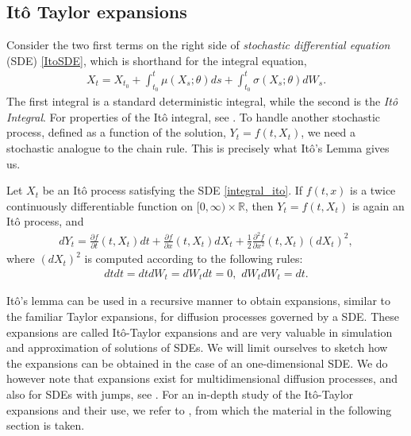\subsection{Itô Taylor expansions}
\label{sec_sub_ito_taylor}
Consider the two first terms on the right side of \textit{stochastic differential equation} (SDE) \eqref{ItoSDE}, which is shorthand for the integral equation,
\begin{align}\label{integral_ito}
X_t=X_{t_0}+\int_{t_0}^{t}\mu(X_s;\theta)ds+\int_{t_0}^{t}\sigma(X_s;\theta)dW_s.
\end{align}
The first integral is a standard deterministic integral, while the second is the \textit{Itô Integral}.
For properties of the Itô integral, see \citet[Chapter 3.2, p.~30]{oksendal2003stochastic}.
To handle another stochastic process, defined as a function of the solution, $Y_t= f(t,X_t)$, we need a stochastic analogue to the chain rule.
This is precisely what Itô's Lemma gives us.
\begin{theorem}\label{thorem; Ito lemma}
	Let $X_t$ be an Itô process satisfying the SDE \ref{integral_ito}.
	If $f(t,x)$ is a twice continuously differentiable function on $[0,\infty)\times\mathbb{R}$, then
	$
	Y_t=f(t,X_t)
	$
	is again an Itô process, and
	\begin{align}
	dY_t=\frac{\partial f}{\partial t}(t,X_t)dt+\frac{\partial f}{\partial x}(t,X_t)dX_t+
	\frac{1}{2}\frac{\partial^2 f}{\partial x^2}(t,X_t)\left(dX_t\right)^2,
	\end{align}
	where $(dX_t)^2$ is computed according to the following rules:
	\begin{align}
	dt dt=dt dW_t = dW_t dt = 0,\,\, dW_tdW_t=dt.
	\end{align}
\end{theorem} \citep{oksendal2003stochastic}

Itô's lemma can be used in a recursive manner to obtain expansions, similar to the familiar Taylor expansions, for diffusion processes governed by a SDE.
These expansions are called Itô-Taylor expansions and are very valuable in simulation and approximation of solutions of SDEs. 
We will limit ourselves to sketch how the expansions can be obtained in the case of an one-dimensional SDE. We do however note that expansions exist for multidimensional diffusion processes, and also for SDEs with jumps, see \citet{platen2010numerical}.
For an in-depth study of the Itô-Taylor expansions and their use, we refer to \citet{kloeden1992numerical}, from which the material in the following section is taken.

